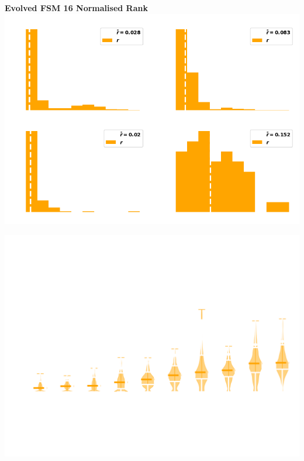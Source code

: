 \documentclass{beamer}
\begin{document}
\begin{frame}
    \begin{center}
        \textbf{Evolved FSM 16 Normalised Rank} \\ \vspace{1cm}
        \includegraphics[width=.8\textwidth]{static/evolved_FSM_16_distributions.png} 
    \end{center}
\end{frame}

\begin{frame}
    \begin{center}
        \includegraphics[width=.8\textwidth]{static/performances_standard.png}
    \end{center}
\end{frame}
\end{document}
